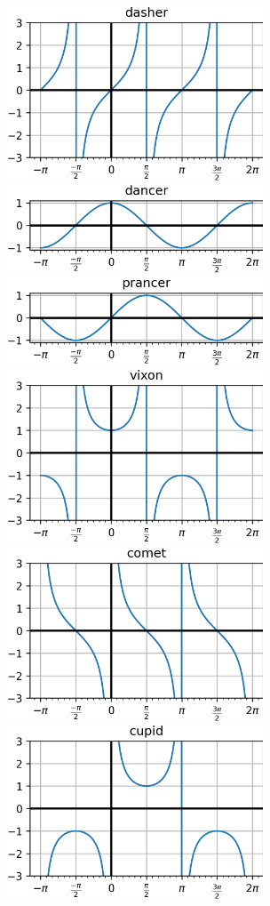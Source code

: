 \documentclass{article}
\begin{document}
\begin{multicols}{2}
\noindent
\includegraphics[width=3in]{dasher.png} \\
\includegraphics[width=3in]{dancer.png} \\
\includegraphics[width=3in]{prancer.png} \\
\includegraphics[width=3in]{vixon.png} \\
\includegraphics[width=3in]{comet.png} \\
\includegraphics[width=3in]{cupid.png}
\end{multicols}
\end{document}
